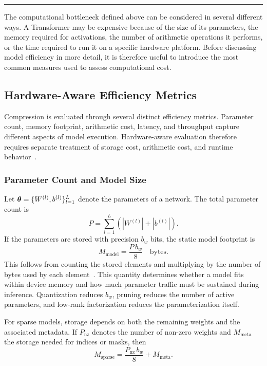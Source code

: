 \par\smallskip
\noindent\rule{0.35\linewidth}{0.4pt}
\par\smallskip

The computational bottleneck defined above can be considered in several different ways. A Transformer may be expensive because of the size of its parameters, the memory required for activations, the number of arithmetic operations it performs, or the time required to run it on a specific hardware platform. Before discussing model efficiency in more detail, it is therefore useful to introduce the most common measures used to assess computational cost.

\subsection{Hardware-Aware Efficiency Metrics}

Compression is evaluated through several distinct efficiency metrics. Parameter count, memory footprint, arithmetic cost, latency, and throughput capture different aspects of model execution. Hardware-aware evaluation therefore requires separate treatment of storage cost, arithmetic cost, and runtime behavior~\cite{Sze2017EfficientDNN}.

\subsubsection{Parameter Count and Model Size}

Let $\bm{\theta} = \{W^{(l)}, b^{(l)}\}_{l=1}^{L}$ denote the parameters of a network. The total parameter count is
\begin{equation}
P = \sum_{l=1}^{L} \left( |W^{(l)}| + |b^{(l)}| \right).
\end{equation}
If the parameters are stored with precision $b_w$ bits, the static model footprint is
\begin{equation}
M_{\text{model}} = \frac{P\, b_w}{8} \quad \text{bytes}.
\end{equation}
This follows from counting the stored elements and multiplying by the number of bytes used by each element~\cite{PyTorchNumel,PyTorchElementSize}.
This quantity determines whether a model fits within device memory and how much parameter traffic must be sustained during inference. Quantization reduces $b_w$, pruning reduces the number of active parameters, and low-rank factorization reduces the parameterization itself.

For sparse models, storage depends on both the remaining weights and the associated metadata. If $P_{\text{nz}}$ denotes the number of non-zero weights and $M_{\text{meta}}$ the storage needed for indices or masks, then
\begin{equation}
M_{\text{sparse}} = \frac{P_{\text{nz}}\, b_w}{8} + M_{\text{meta}}.
\end{equation}

